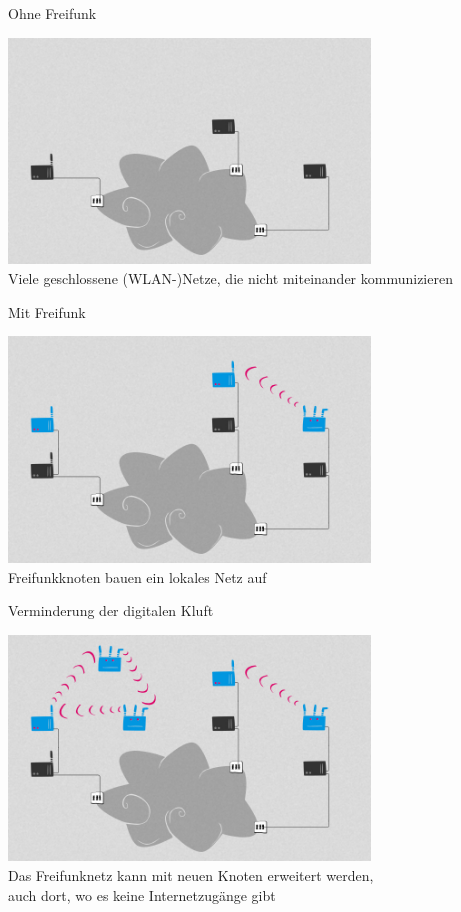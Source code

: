 \documentclass[10pt]{beamer}
\begin{document}
\begin{frame}{Ohne Freifunk}
	\begin{center}
		\includegraphics[height=6cm]{images/network_1} \\
		\vfill
		Viele geschlossene (WLAN-)Netze, die nicht miteinander kommunizieren
	\end{center}
\end{frame}

\begin{frame}{Mit Freifunk}
	\begin{center}
		\includegraphics[height=6cm]{images/network_2} \\
		\vfill
		Freifunkknoten bauen ein lokales Netz auf
	\end{center}
\end{frame}

\begin{frame}{Verminderung der digitalen Kluft}
	\begin{center}
		\includegraphics[height=6cm]{images/network_3} \\
		\vfill
		Das Freifunknetz kann mit neuen Knoten erweitert werden,\\ auch dort, wo es keine Internetzugänge gibt
	\end{center}
\end{frame}
\end{document}
